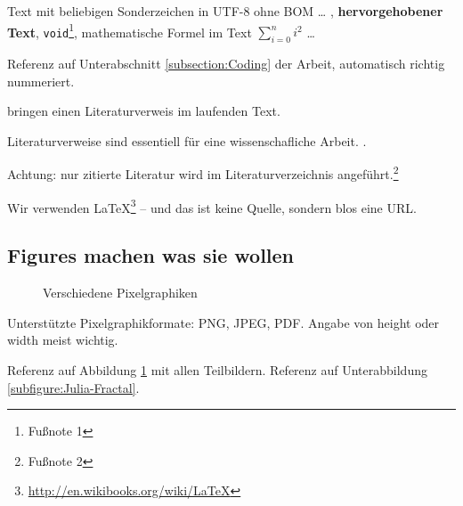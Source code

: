 
Text mit beliebigen Sonderzeichen in UTF-8 ohne BOM \ldots
,
\textbf{hervorgehobener Text},
\texttt{void}\footnote{Fußnote 1},
mathematische Formel im Text $\sum_{i=0}^n i^2$
\ldots

Referenz auf Unterabschnitt \ref{subsection:Coding} der Arbeit, automatisch richtig nummeriert.

\textcite[]{Mulloni:2010} bringen einen Literaturverweis im laufenden Text.

Literaturverweise sind essentiell für eine wissenschafliche Arbeit. \autocite[]{McConnell:2004:CCS:1096143}.

Achtung: nur zitierte Literatur wird im Literaturverzeichnis
angeführt.\footnote{Fußnote 2}


Wir verwenden \LaTeX\footnote{ \url{http://en.wikibooks.org/wiki/LaTeX}} -- und das
ist keine Quelle, sondern blos eine URL.

\subsection{Figures machen was sie wollen}

\begin{figure}[!ht]
	\centering
	\qquad
	\caption[
		Verschiedene Pixelgraphiken\newline
		\small\texttt{https://mediacube.at/wiki/}
	]{
		Verschiedene Pixelgraphiken
	}
	\label{figure:PixelImages}
\end{figure}

Unterstützte Pixelgraphikformate: PNG, JPEG, PDF.
Angabe von height oder width meist wichtig.

Referenz auf Abbildung \ref{figure:PixelImages} mit allen Teilbildern.
Referenz auf Unterabbildung \ref{subfigure:Julia-Fractal}.

